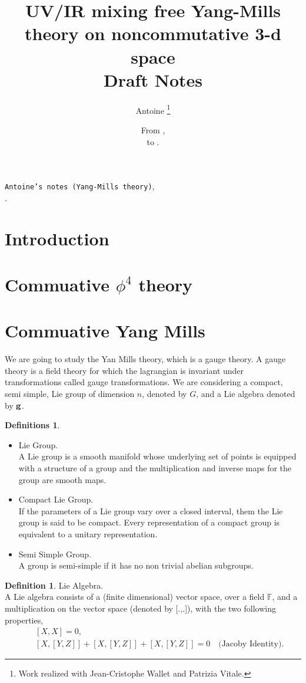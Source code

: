 \documentclass[a4paper,11pt]{article} %
\title{UV/IR mixing free Yang-Mills theory on noncommutative 3-d space\\ \vspace{2mm} \textbf{Draft Notes}} %
\author{Antoine
        \thanks{Work realized with Jean-Cristophe Wallet and Patrizia Vitale.}} %
\date{From \start, \\ to \version.} %
\numberwithin{equation}{section} %
\numberwithin{figure}{section} %
\theoremstyle{plain} %
\theoremstyle{definition} %
\newtheorem{dfn}{Definition}[section]
\newtheorem{dfns}{Definitions}[section]
\theoremstyle{remark} %
\begin{document}

\begin{flushright}
 \texttt{Antoine's notes (Yang-Mills theory)}, \\
 \texttt{\version}.
\end{flushright}

\section{Introduction}

\noindent
[blablabla]

\section{Commuative $\phi^4$ theory}

\noindent
[blablabla]

\section{Commuative Yang Mills}

\noindent
We are going to study the Yan Mills theory, which is a gauge theory. A gauge theory is a field theory for which the lagrangian is invariant under transformations called gauge transformations. We are considering a compact, semi simple, Lie group of dimension $n$, denoted by $G$, and a Lie algebra denoted by $\bf{g}$.

\begin{dfns} 
  \begin{itemize}
  \item Lie Group. \\
  A Lie group is a smooth manifold whose underlying set of points is equipped with a structure of a group and the multiplication and inverse maps for the group are smooth maps.
  \item Compact Lie Group. \\
  If the parameters of a Lie group vary over a closed interval, them the Lie group is said to be compact. Every representation of a compact group is equivalent to a unitary representation. 
  \item Semi Simple Group. \\
  A group is semi-simple if it has no non trivial abelian subgroups.
 \end{itemize}
\end{dfns}

\begin{dfn}
 Lie Algebra. \\
 A Lie algebra consists of a (finite dimensional) vector space, over a field $\mathbb{F}$, and a multiplication on the vector space (denoted by [.,.]), with the two following properties,
 \begin{eqnarray*}
  && [X,X] = 0, \\
  && [X,[Y,Z]] + [X,[Y,Z]] + [X,[Y,Z]] = 0 \quad \text{(Jacoby Identity)}.
 \end{eqnarray*}
\end{dfn}
\end{document}
